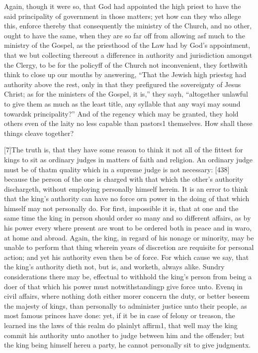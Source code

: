 Again, though it were so, that God had appointed the high priest to have the said principality of government in those matters; yet how can they who allege this, enforce thereby that consequently the ministry of the Church, and no other, ought to have the same, when they are so far off from allowing asf much to the ministry of the Gospel, as the priesthood of the Law had by God’s appointment, that we but collecting thereout a difference in authority and jurisdiction amongst the Clergy, to be for the policyff of the Church not inconvenient, they forthwith think to close up our mouths by answering, “That the Jewish high priestsg had authority above the rest, only in that they prefigured the sovereignty of Jesus Christ; as for the ministers of the Gospel, it is,” they sayh, “altogether unlawful to give them as much as the least title, any syllable that any wayi may sound towardsk principality?” And of the regency which may be granted, they hold others even of the laity no less capable than pastors1 themselves. How shall these things cleave together?

[7]The truth is, that they have some reason to think it not all of the fittest for kings to sit as ordinary judges in matters of faith and religion. An ordinary judge must be of thatm quality which in a supreme judge is not necessary: [438] because the person of the one is charged with that which the other’s authority dischargeth, without employing personally himself herein. It is an error to think that the king’s authority can have no force orn power in the doing of that which himself may not personally do. For first, impossible it is, that at one and the same time the king in person should order so many and so different affairs, as by his power every where present are wont to be ordered both in peace and in waro, at home and abroad. Again, the king, in regard of his nonage or minority, may be unable to perform that thing wherein years of discretion are requisite for personal action; and yet his authority even then be of force. For which cause we say, that the king’s authority dieth not, but is, and worketh, always alike. Sundry considerations there may be, effectual to withhold the king’s person from being a doer of that which his power must notwithstandingp give force unto. Evenq in civil affairs, where nothing doth either morer concern the duty, or better beseem the majesty of kings, than personally to administer justice unto their people, as most famous princes have done: yet, if it be in case of felony or treason, the learned ins the laws of this realm do plainlyt affirm1, that well may the king commit his authority unto another to judge between him and the offender; but the king being himself hereu a party, he cannot personally sit to give judgmentx.

